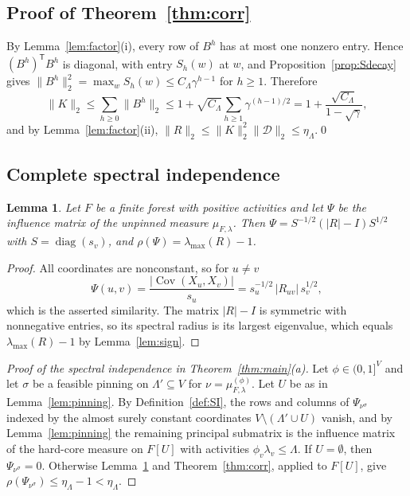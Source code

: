 \documentclass{amsart}
\numberwithin{equation}{section}
\numberwithin{table}{section}
\newtheorem{lemma}[theorem]{Lemma}
\theoremstyle{definition}
\theoremstyle{remark}
\newcommand{\Cov}{\operatorname{Cov}}
\newcommand{\diag}{\operatorname{diag}}
\newcommand{\lmax}{\lambda_{\max}}
\begin{document}
\subsection{Proof of Theorem~\ref{thm:corr}}
By Lemma~\ref{lem:factor}(i), every row of $B^h$ has at most one nonzero entry. Hence $(B^h)^{\mathsf T}B^h$ is diagonal, with entry $S_h(w)$ at $w$, and Proposition~\ref{prop:Sdecay} gives $\|B^h\|_2^2=\max_wS_h(w)\le C_\Lambda\gamma^{h-1}$ for $h\ge1$. Therefore
\[
\|K\|_2\le\sum_{h\ge0}\|B^h\|_2\le1+\sqrt{C_\Lambda}\sum_{h\ge1}\gamma^{(h-1)/2}=1+\frac{\sqrt{C_\Lambda}}{1-\sqrt\gamma},
\]
and by Lemma~\ref{lem:factor}(ii), $\|R\|_2\le\|K\|_2^2\|\mathcal D\|_2\le\eta_\Lambda$.\qed

\subsection{Complete spectral independence}

\begin{lemma}\label{lem:influence}
Let $F$ be a finite forest with positive activities and let $\Psi$ be the influence matrix of the unpinned measure $\mu_{F,\lambda}$. Then $\Psi=S^{-1/2}(|R|-I)S^{1/2}$ with $S=\diag(s_v)$, and $\rho(\Psi)=\lmax(R)-1$.
\end{lemma}

\begin{proof}
All coordinates are nonconstant, so for $u\ne v$
\[
\Psi(u,v)=\frac{|\Cov(X_u,X_v)|}{s_u}=s_u^{-1/2}\,|R_{uv}|\,s_v^{1/2},
\]
which is the asserted similarity. The matrix $|R|-I$ is symmetric with nonnegative entries, so its spectral radius is its largest eigenvalue, which equals $\lmax(R)-1$ by Lemma~\ref{lem:sign}.
\end{proof}

\begin{proof}[Proof of the spectral independence in Theorem~\ref{thm:main}(a)]
Let $\phi\in(0,1]^V$ and let $\sigma$ be a feasible pinning on $\Lambda'\subseteq V$ for $\nu=\mu_{F,\lambda}^{(\phi)}$. Let $U$ be as in Lemma~\ref{lem:pinning}. By Definition~\ref{def:SI}, the rows and columns of $\Psi_{\nu^\sigma}$ indexed by the almost surely constant coordinates $V\setminus(\Lambda'\cup U)$ vanish, and by Lemma~\ref{lem:pinning} the remaining principal submatrix is the influence matrix of the hard-core measure on $F[U]$ with activities $\phi_v\lambda_v\le\Lambda$. If $U=\emptyset$, then $\Psi_{\nu^\sigma}=0$. Otherwise Lemma~\ref{lem:influence} and Theorem~\ref{thm:corr}, applied to $F[U]$, give $\rho(\Psi_{\nu^\sigma})\le\eta_\Lambda-1<\eta_\Lambda$.
\end{proof}
\end{document}
